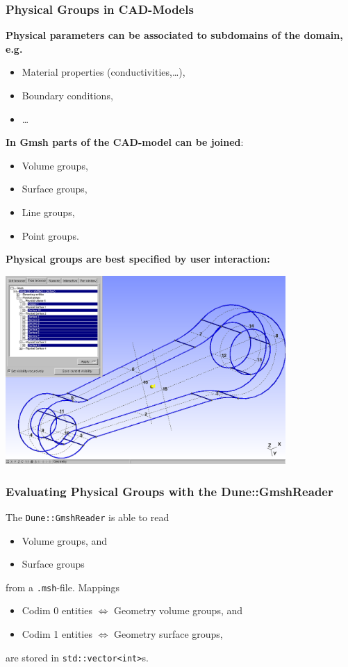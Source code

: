 \begin{frame}
  \frametitle<presentation>{Physical Groups in CAD-Models}
  \textbf{Physical parameters can be associated to subdomains of the
  domain, e.g.}
  \begin{itemize}
    \item Material properties (conductivities,\ldots),
    \item Boundary conditions,
    \item \ldots
  \end{itemize}
  \textbf{In Gmsh parts of the CAD-model can be joined}:
  \begin{itemize}
    \item Volume groups,
    \item Surface groups,
    \item Line groups,
    \item Point groups.
  \end{itemize}
  \textbf{Physical groups are best specified by user interaction:}
  \begin{center}
    \includegraphics[width=0.8\textwidth]{./EPS/crank/geo2}
  \end{center}
\end{frame}

\begin{frame}
  \frametitle<presentation>{Evaluating Physical Groups with the Dune::GmshReader}
  The \lstinline!Dune::GmshReader! is able to read
  \begin{itemize}
    \item Volume groups, and
    \item Surface groups
  \end{itemize}
  from a \lstinline!.msh!-file. Mappings
  \begin{itemize}
    \item Codim 0 entities $\Leftrightarrow$ Geometry volume groups, and
    \item Codim 1 entities $\Leftrightarrow$ Geometry surface groups,
  \end{itemize}
  are stored in \lstinline!std::vector<int>!s.
\end{frame}

